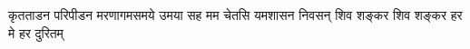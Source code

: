 

{कृतताडन परिपीडन मरणागमसमये}
{उमया सह मम चेतसि यमशासन निवसन्}
{शिव शङ्कर शिव शङ्कर हर मे हर दुरितम्}